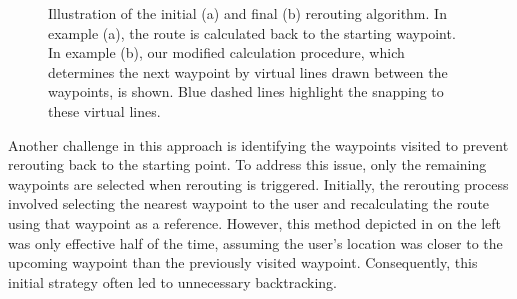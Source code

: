 \begin{figure}[t]
\centering
{}
\caption{Illustration of the initial (a) and final (b) rerouting algorithm. In example (a), the route is calculated back to the starting waypoint. In example (b), our modified calculation procedure, which determines the next waypoint by virtual lines drawn between the waypoints, is shown. Blue dashed lines highlight the snapping to these virtual lines.}
\label{fig:rerouting-strategy-comparison}
\end{figure}

Another challenge in this approach is identifying the waypoints visited to prevent rerouting back to the starting point. To address this issue, only the remaining waypoints are selected when rerouting is triggered. Initially, the rerouting process involved selecting the nearest waypoint to the user and recalculating the route using that waypoint as a reference. However, this method depicted in  on the left was only effective half of the time, assuming the user's location was closer to the upcoming waypoint than the previously visited waypoint. Consequently, this initial strategy often led to unnecessary backtracking.

